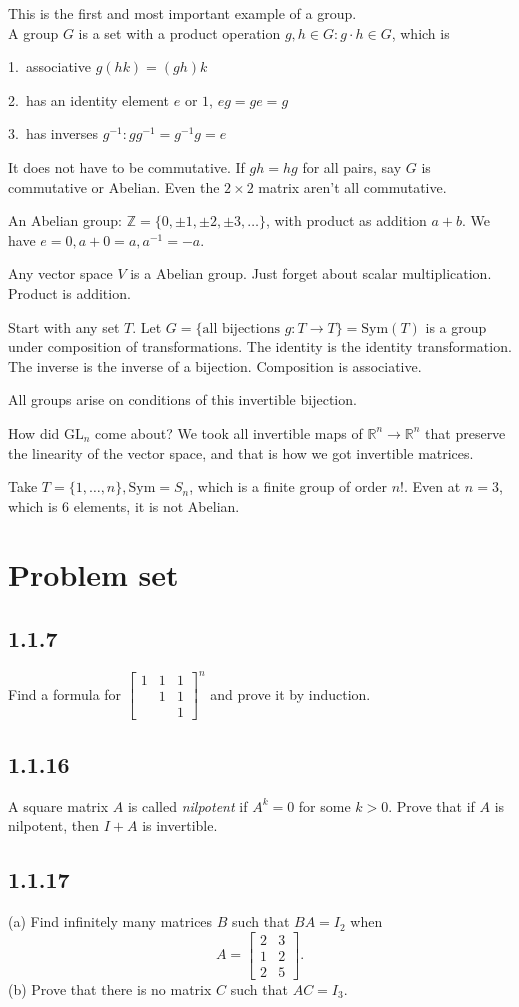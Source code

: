 \documentclass[12pt]{article}
\newcommand{\RR}{\mathbb{R}}
\newcommand{\GL}{\text{GL}}
\newcommand{\inv}[1]{#1^{-1}}
\theoremstyle{definition}
\begin{document}
This is the first and most important example of a group. \\

A group \(G\) is a set with a product operation \(g,h\in G: g\cdot h\in G\), which is

1.\ associative \(g(hk) = (gh)k\)

2.\ has an identity element \(e\) or \(1\), \(eg=ge=g\)

3.\ has inverses \(\inv{g}: g\inv{g}=\inv{g}g=e\)

It does not have to be commutative. If \(gh=hg\) for all pairs, say \(G\) is commutative or Abelian.
Even the \(2 \times 2\) matrix aren't all commutative.

An Abelian group: \(\mathbb{Z} = \{0, \pm1, \pm2, \pm3, \ldots \} \),
with product as addition \(a + b\). We have \(e = 0, a+0=a, \inv{a}=-a\).

Any vector space \(V\) is a Abelian group. Just forget about scalar multiplication. Product is addition.

Start with any set \(T\). Let \(G = \{\text{all bijections } g:T\rightarrow T\}=\text{Sym}(T)\)
is a group under composition of transformations. The identity is the identity transformation.
The inverse is the inverse of a bijection. Composition is associative.

All groups arise on conditions of this invertible bijection.

How did \(\GL_n\) come about? We took all invertible maps of \(\RR^n\rightarrow\RR^n\) that
preserve the linearity of the vector space, and that is how we got invertible matrices.

Take \(T=\{1,\ldots,n\},\text{Sym}=S_n\), which is a finite group of order \(n\)!.
Even at \(n=3\), which is 6 elements, it is not Abelian.

\section*{Problem set}
\subsection*{1.1.7}

Find a formula for \({\left[\begin{smallmatrix}
    1 & 1 & 1\\
      & 1 & 1\\
      &   & 1
\end{smallmatrix}\right]}^{n}\) and prove it by induction.
\subsection*{1.1.16}
A square matrix \(A\) is called \emph{nilpotent} if \(A^k = 0\) for some \(k > 0\).
Prove that if \(A\) is nilpotent, then \(I + A\) is invertible.
\subsection*{1.1.17}
(a) Find infinitely many matrices \(B\) such that \(BA = I_2\) when
\[A = \begin{bmatrix}
    2 & 3\\
    1 & 2\\
    2 & 5
\end{bmatrix}.\]
(b) Prove that there is no matrix \(C\) such that \(AC = I_3\).
\end{document}
